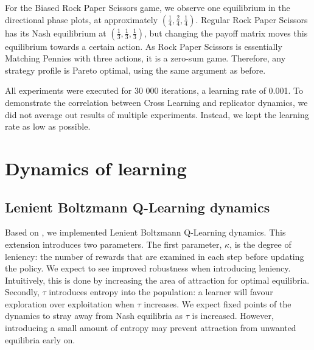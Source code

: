 \documentclass[10pt,a4paper]{article}
\begin{document}
For the Biased Rock Paper Scissors game, we observe one equilibrium in the directional phase plots, at approximately $(\frac{1}{4},\frac{2}{4},\frac{1}{4})$. Regular Rock Paper Scissors has its Nash equilibrium at $(\frac{1}{3},\frac{1}{3},\frac{1}{3})$, but changing the payoff matrix moves this equilibrium towards a certain action. As Rock Paper Scissors is essentially Matching Pennies with three actions, it is a zero-sum game. Therefore, any strategy profile is Pareto optimal, using the same argument as before.

All experiments were executed for 30 000 iterations, a learning rate of 0.001. To demonstrate the correlation between Cross Learning and replicator dynamics, we did not average out results of multiple experiments. Instead, we kept the learning rate as low as possible.

\section{Dynamics of learning}

\subsection{Lenient Boltzmann Q-Learning dynamics}
Based on \citet{evoldynamics}, we implemented Lenient Boltzmann Q-Learning dynamics. This extension introduces two parameters. The first parameter, $\kappa$, is the degree of leniency: the number of rewards that are examined in each step before updating the policy. We expect to see improved robustness when introducing leniency. Intuitively, this is done by increasing the area of attraction for optimal equilibria. Secondly, $\tau$ introduces entropy into the population: a learner will favour exploration over exploitation when $\tau$ increases. We expect fixed points of the dynamics to stray away from Nash equilibria as $\tau$ is increased. However, introducing a small amount of entropy may prevent attraction from unwanted equilibria early on.
\end{document}
